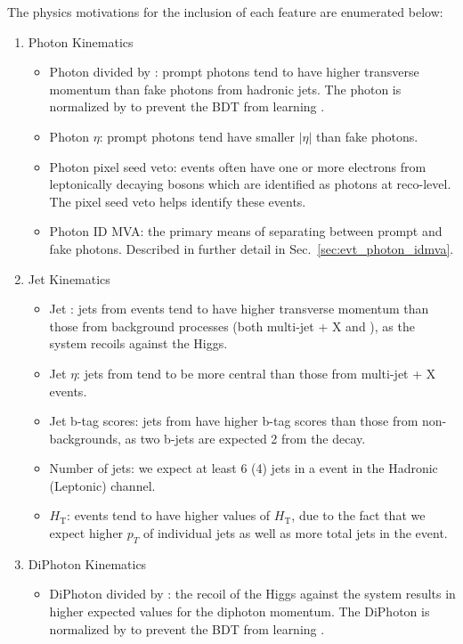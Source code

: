 The physics motivations for the inclusion of each feature are enumerated below:
\begin{enumerate}
    \item Photon Kinematics
    \begin{itemize}
        \item Photon \pT divided by \mgg: prompt photons tend to have higher transverse momentum than fake photons from hadronic jets. The photon \pT is normalized by \mgg to prevent the BDT from learning \mH.
        \item Photon $\eta$: prompt photons tend have smaller $|\eta|$ than fake photons.
        \item Photon pixel seed veto: \ttplusX events often have one or more electrons from leptonically decaying \PW bosons which are identified as photons at reco-level. The pixel seed veto helps identify these events.
        \item Photon ID MVA: the primary means of separating between prompt and fake photons. Described in further detail in Sec.~\ref{sec:evt_photon_idmva}.
    \end{itemize}
    \item Jet Kinematics
    \begin{itemize}
        \item Jet \pT: jets from \ttH events tend to have higher transverse momentum than those from background processes (both multi-jet + X and \ttplusX), as the \ttb system recoils against the Higgs.
        \item Jet $\eta$: jets from \ttH tend to be more central than those from multi-jet + X events.
        \item Jet b-tag scores: jets from \ttH have higher b-tag scores than those from non-\ttb backgrounds, as two b-jets are expected 2 from the \ttb decay. 
        \item Number of jets: we expect at least 6 (4) jets in a \ttH event in the Hadronic (Leptonic) channel.
        \item $H_{\text{T}}$: \ttH events tend to have higher values of $H_{\text{T}}$, due to the fact that we expect higher $p_T$ of individual jets as well as more total jets in the event.
    \end{itemize}
    \item DiPhoton Kinematics
    \begin{itemize}
        \item DiPhoton \pT divided by \mgg: the recoil of the Higgs against the \ttb system results in higher expected values for the diphoton momentum. The DiPhoton \pT is normalized by \mgg to prevent the BDT from learning \mH.

\end{itemize}
\end{enumerate}
